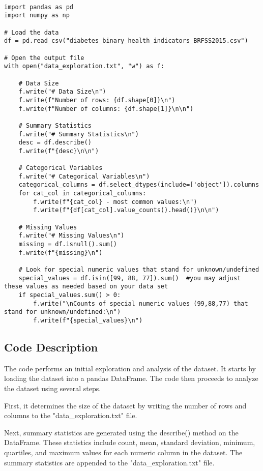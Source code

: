 \documentclass[11pt]{article}
\begin{document}
\begin{verbatim}

import pandas as pd
import numpy as np

# Load the data
df = pd.read_csv("diabetes_binary_health_indicators_BRFSS2015.csv")

# Open the output file
with open("data_exploration.txt", "w") as f:

    # Data Size
    f.write("# Data Size\n")
    f.write(f"Number of rows: {df.shape[0]}\n")
    f.write(f"Number of columns: {df.shape[1]}\n\n")

    # Summary Statistics
    f.write("# Summary Statistics\n")
    desc = df.describe()
    f.write(f"{desc}\n\n")

    # Categorical Variables
    f.write("# Categorical Variables\n")
    categorical_columns = df.select_dtypes(include=['object']).columns
    for cat_col in categorical_columns:
        f.write(f"{cat_col} - most common values:\n")
        f.write(f"{df[cat_col].value_counts().head()}\n\n")
    
    # Missing Values
    f.write("# Missing Values\n")
    missing = df.isnull().sum()
    f.write(f"{missing}\n")
    
    # Look for special numeric values that stand for unknown/undefined
    special_values = df.isin([99, 88, 77]).sum()  #you may adjust these values as needed based on your data set 
    if special_values.sum() > 0:
        f.write("\nCounts of special numeric values (99,88,77) that stand for unknown/undefined:\n")
        f.write(f"{special_values}\n")

\end{verbatim}

\subsection{Code Description}

The code performs an initial exploration and analysis of the dataset. It starts by loading the dataset into a pandas DataFrame. The code then proceeds to analyze the dataset using several steps.

First, it determines the size of the dataset by writing the number of rows and columns to the "data\_exploration.txt" file.

Next, summary statistics are generated using the describe() method on the DataFrame. These statistics include count, mean, standard deviation, minimum, quartiles, and maximum values for each numeric column in the dataset. The summary statistics are appended to the "data\_exploration.txt" file.
\end{document}
